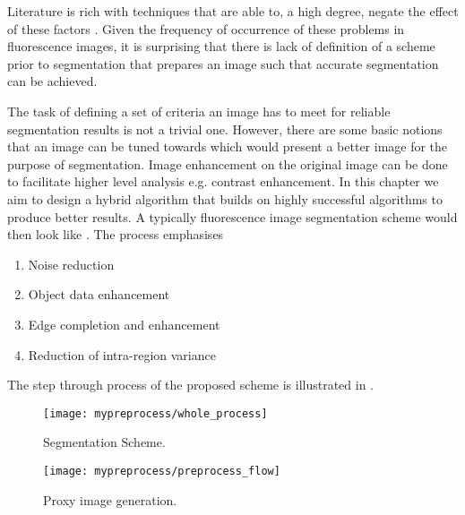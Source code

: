Literature is rich with techniques that are able to, a high degree, negate the effect of these factors \cite{Lysaker2004,Wang2008,Zhou2013}. Given the frequency of occurrence of these problems in fluorescence images, it is surprising that there is lack of definition of a scheme prior to segmentation that prepares an image such that accurate segmentation can be achieved.

The task of defining a set of criteria an image has to meet for reliable segmentation results is not a trivial one. However, there are some basic notions that an image can be tuned towards which would present a better image for the purpose of segmentation.
Image enhancement on the original image can be done to facilitate higher level analysis e.g. contrast enhancement.
In this chapter we aim to design a hybrid algorithm that builds on highly successful algorithms to produce better results. A typically fluorescence image segmentation scheme would then look like . The process emphasises

\begin{enumerate}
	\item Noise reduction
	\item Object data enhancement
	\item Edge completion and enhancement
	\item Reduction of intra-region variance
\end{enumerate}

The step through process of the proposed scheme is illustrated in .

\begin{figure}[!h]
	\centering
	\texttt{[image: mypreprocess/whole\_process]}
	\caption{Segmentation Scheme.}
	\label{fig:wholescheme}
\end{figure}

\begin{figure}[!h]
	\centering
	\texttt{[image: mypreprocess/preprocess\_flow]}
	\caption{Proxy image generation.}
	\label{fig:flowchartproposedscheme}
\end{figure}


